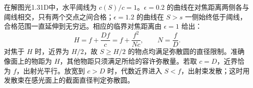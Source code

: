\documentclass[UTF8,fontset=fandol,a4paper,11pt]{ctexart}
\begin{document}
在解图光1.31D中，水平阈线为 $c(S)/c=1$。$\epsilon=0.2$ 的曲线在对焦距离两侧各与阈线相交，只有两个交点之间合格；$\epsilon=1.2$ 的曲线在 $S>s$ 一侧始终低于阈线，合格范围一直延伸到无穷远。相应的临界对焦距离由 $\epsilon=1$ 给出：
\[
H=f+\frac{Df}{c}=f+\frac{f^2}{Nc},
\qquad N=\frac fD.
\]
对焦于 $H$ 时，近界为 $H/2$，故 $S\ge H/2$ 的物点均满足弥散圆的直径限制。准确像面上的物距为 $H$，其他物距只须满足所给的容许弥散量。若取 $c=D$，近界恰为 $f$，出射光平行。放宽到 $c>D$ 时，代数近界进入 $S<f$，出射束发散；这时用发散束在感光面上的截面直径判定弥散圆。
\begin{center}\begin{minipage}{.97\linewidth}\centering
{}
\end{minipage}
\end{center}
\end{document}

